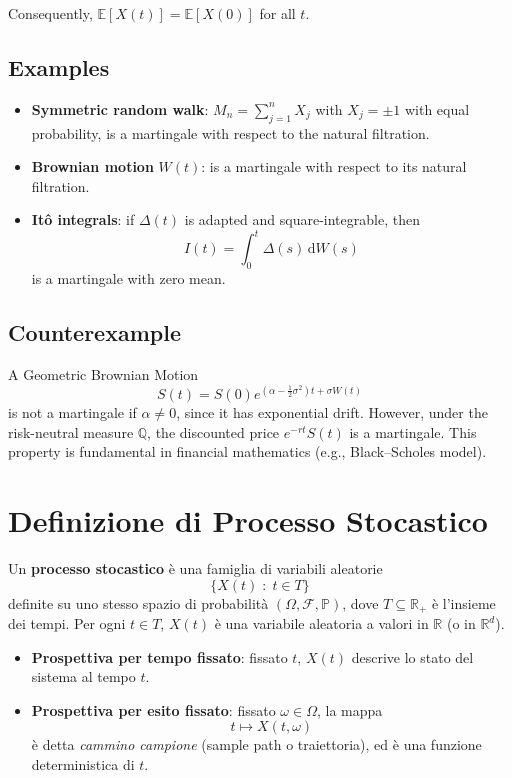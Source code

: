 \documentclass[12pt,a4paper]{book}
\theoremstyle{remark}
\newcommand{\EE}{\mathbb{E}}          %
\newcommand{\QQ}{\mathbb{Q}}          %
\newcommand{\dd}{\mathrm{d}}
\begin{document}
Consequently, $\EE[X(t)] = \EE[X(0)]$ for all $t$.

\subsection*{Examples}
\begin{itemize}
    \item \textbf{Symmetric random walk}: $M_n = \sum_{j=1}^n X_j$ with $X_j = \pm 1$ with equal probability, is a martingale with respect to the natural filtration.
    \item \textbf{Brownian motion} $W(t)$: is a martingale with respect to its natural filtration.
    \item \textbf{It\^o integrals}: if $\Delta(t)$ is adapted and square-integrable, then 
    \[
    I(t) = \int_0^t \Delta(s)\,\dd W(s)
    \]
    is a martingale with zero mean.
\end{itemize}

\subsection*{Counterexample}
A Geometric Brownian Motion 
\[
S(t) = S(0) e^{(\alpha - \tfrac{1}{2}\sigma^2)t + \sigma W(t)}
\]
is not a martingale if $\alpha \neq 0$, since it has exponential drift. However, under the risk-neutral measure $\QQ$, the discounted price $e^{-rt}S(t)$ is a martingale. This property is fundamental in financial mathematics (e.g., Black--Scholes model).


\newpage
\section{Definizione di Processo Stocastico}

Un \textbf{processo stocastico} è una famiglia di variabili aleatorie
\[
\{X(t) \; : \; t \in T\}
\]
definite su uno stesso spazio di probabilità $(\Omega, \mathcal{F}, \mathbb{P})$, 
dove $T \subseteq \mathbb{R}_+$ è l’insieme dei tempi. 
Per ogni $t \in T$, $X(t)$ è una variabile aleatoria a valori in $\mathbb{R}$ (o in $\mathbb{R}^d$). 

\begin{itemize}
  \item \textbf{Prospettiva per tempo fissato}: fissato $t$, $X(t)$ descrive lo stato del sistema al tempo $t$. 
  \item \textbf{Prospettiva per esito fissato}: fissato $\omega \in \Omega$, la mappa
  \[
  t \mapsto X(t,\omega)
  \]
  è detta \emph{cammino campione} (sample path o traiettoria), ed è una funzione deterministica di $t$. 
\end{itemize}
\end{document}
